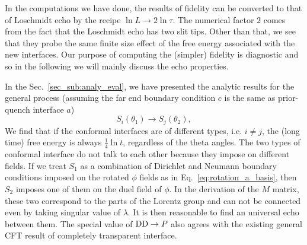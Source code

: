 

In the computations we have done, the results of fidelity can be converted to that of Loschmidt echo by the recipe $ \ln L \rightarrow 2 \ln \tau$. The numerical factor $2$ comes from the fact that the Loschmidt echo has two slit tips. Other than that, we see that they probe the same finite size effect of the free energy associated with the new interfaces. Our purpose of computing the (simpler) fidelity is diagnostic and so in the following we will mainly discuss the echo properties. 

In the Sec.~\ref{sec_sub:analy_eval}, we have presented the analytic results for the general process (assuming the far end boundary condition $c$ is the same as prior-quench interface $a$) 
\begin{equation}
 S_i( \theta_1 ) \rightarrow S_j( \theta_2 ),
\end{equation}
We find that if the conformal interfaces are of different types, i.e. $i \ne j$, the (long time) free energy is always $\frac{1}{4} \ln t$, regardless of the theta angles. The two types of conformal interface do not talk to each other because they impose on different fields. If we treat $S_1$ as a combination of Dirichlet and Neumann boundary conditions imposed on the rotated $\phi$ fields as in Eq.~\eqref{eq:rotation_a_basis}, then $S_2$ imposes one of them on the duel field of $\phi$. In the derivation of the $M$ matrix, these two correspond to the parts of the Lorentz group and can not be connected even by taking singular value of $\lambda$. It is then reasonable to find an universal echo between them. The special value of ${\rm DD} \rightarrow P$ also agrees with the existing general CFT result of completely transparent interface\cite{stephan_logarithmic_2013,stephan_local_2011,vasseur_universal_2014,vasseur_crossover_2013,kennes_universal_2014}. 



